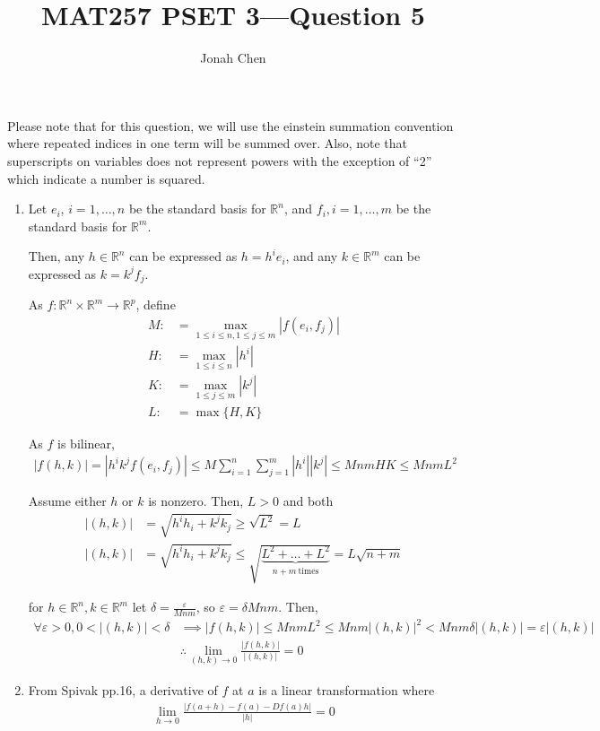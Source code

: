 \documentclass{exam}
\title{MAT257 PSET 3---Question 5}
\author{Jonah Chen}
\numberwithin{equation}{section}
\newcommand{\R}{\mathbb{R}}
\begin{document}
    \sffamily
    \maketitle
    Please note that for this question, we will use the einstein summation convention where repeated indices in one term will be summed over. Also, note that superscripts on variables does not represent powers with the exception of ``2'' which indicate a number is squared.
    \begin{enumerate}[label=(\alph*)]
        \item Let $e_i$, $i=1,\dots,n$ be the standard basis for $\R^n$, and $f_i,i=1,\dots,m$ be the standard basis for $\R^m$. 
        
        Then, any $h\in\R^n$ can be expressed as $h=h^ie_i$, and any $k\in\R^m$ can be expressed as $k=k^jf_j$.

        As $f:\R^n\times\R^m\to\R^p$, define 
        \begin{align*}
            M:&=\max_{1\leq i\leq n,1\leq j\leq m}|f(e_i,f_j)|\\
            H:&=\max_{1\leq i\leq n} |h^i|\\
            K:&=\max_{1\leq j\leq m} |k^j|\\
            L:&=\max\{H,K\}
        \end{align*}

        As $f$ is bilinear, 
        \begin{align*}
            |f(h,k)|=|h^ik^jf(e_i,f_j)|\leq M\sum_{i=1}^n\sum_{j=1}^m|h^i||k^j|\leq MnmHK\leq MnmL^2
        \end{align*}

        Assume either $h$ or $k$ is nonzero. Then, $L>0$ and both
        \begin{align*}
            |(h,k)|&=\sqrt{h^ih_i+k^jk_j}\geq\sqrt{L^2}=L\\
            |(h,k)|&=\sqrt{h^ih_i+k^jk_j}\leq\sqrt{\underbrace{L^2+\dots+L^2}_{n+m\:\text{times}}}=L\sqrt{n+m}
        \end{align*}

        for $h\in\R^n,k\in\R^m$ let $\delta=\frac{\varepsilon}{Mnm}$, so $\varepsilon=\delta Mnm$. Then,
        \begin{align*}
            \forall\varepsilon>0,0<|(h,k)|<\delta&\implies
            |f(h,k)|\leq MnmL^2\leq Mnm|(h,k)|^2<Mnm\delta|(h,k)| =\varepsilon|(h,k)|\\
            &\therefore\lim_{(h,k)\to 0}\frac{|f(h,k)|}{|(h,k)|}=0
        \end{align*}
        \item From Spivak pp.16, a derivative of $f$ at $a$ is a linear transformation where 
        \begin{align*}
            \lim_{h\to 0}\frac{|f(a+h)-f(a)-Df(a)h|}{|h|}=0
        \end{align*}
        

\end{enumerate}
\end{document}
